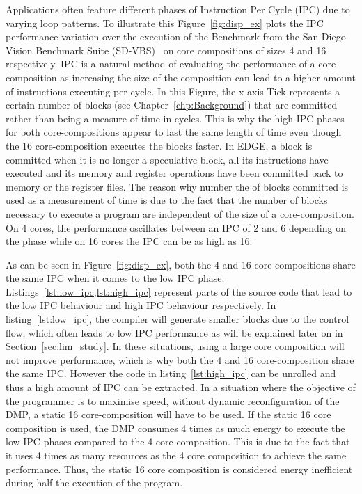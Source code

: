 Applications often feature different phases of Instruction Per Cycle (IPC) due to varying loop patterns.
To illustrate this Figure~\ref{fig:disp_ex} plots the IPC performance variation over the execution of the  Benchmark from the San-Diego Vision Benchmark Suite (SD-VBS)~\cite{sdvbs} on core compositions of sizes 4 and 16 respectively.
IPC is a natural method of evaluating the performance of a core-composition as increasing the size of the composition can lead to a higher amount of instructions executing per cycle.
In this Figure, the x-axis Tick represents a certain number of blocks (see Chapter~\ref{chp:Background}) that are committed rather than being a measure of time in cycles.
This is why the high IPC phases for both core-compositions appear to last the same length of time even though the 16 core-composition executes the blocks faster.
In EDGE, a block is committed when it is no longer a speculative block, all its instructions have executed and its memory and register operations have been committed back to memory or the register files.
The reason why number the of blocks committed is used as a measurement of time is due to the fact that the number of blocks necessary to execute a program are independent of the size of a core-composition.
On 4 cores, the performance oscillates between an IPC of 2 and 6 depending on the phase while on 16 cores the IPC can be as high as 16.

As can be seen in Figure~\ref{fig:disp_ex}, both the 4 and 16 core-compositions share the same IPC when it comes to the low IPC phase.
Listings~\ref{lst:low_ipc,lst:high_ipc} represent parts of the source code that lead to the low IPC behaviour and high IPC behaviour respectively.
In listing~\ref{lst:low_ipc}, the compiler will generate smaller blocks due to the control flow, which often leads to low IPC performance as will be explained later on in Section~\ref{sec:lim_study}.
In these situations, using a large core composition will not improve performance, which is why both the 4 and 16 core-composition share the same IPC.
However the code in listing~\ref{lst:high_ipc} can be unrolled and thus a high amount of IPC can be extracted.
In a situation where the objective of the programmer is to maximise speed, without dynamic reconfiguration of the DMP, a static 16 core-composition will have to be used.
If the static 16 core composition is used, the DMP consumes 4 times as much energy to execute the low IPC phases compared to the 4 core-composition.
This is due to the fact that it uses 4 times as many resources as the 4 core composition to achieve the same performance.
Thus, the static 16 core composition is considered energy inefficient during half the execution of the program.

